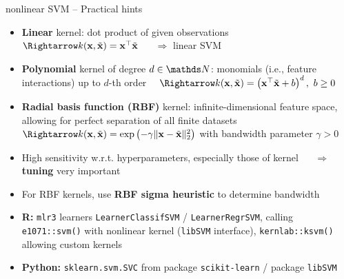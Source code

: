 \begin{frame}{nonlinear SVM -- Practical hints}

\footnotesize


\begin{itemize}
  \item \textbf{Linear} kernel: dot product of given observations ~~ 
  $\Rightarrow \kxxt = \xv^\top \xtil$ ~~ $\Rightarrow$ linear SVM
  \item \textbf{Polynomial} kernel of degree $d \in \N$: monomials (i.e., 
  feature interactions) up to $d$-th 
  order ~~$\Rightarrow 
  \kxxt = \left(\xv^\top \xtil + b \right)^d, ~ b \geq 0$
  \item \textbf{Radial basis function (RBF)} kernel: infinite-dimensional 
  feature space, allowing for perfect separation of all finite 
  datasets ~~ $\Rightarrow \kxxt = \exp \left( -\gamma \| \xv - \xtil \|_2^2 
  \right )$ with 
  bandwidth parameter $\gamma > 0$
\end{itemize}
 
\medskip

 
 \begin{itemize}
  \item High sensitivity w.r.t. hyperparameters, especially those of kernel
  ~~ $\Rightarrow$ \textbf{tuning} very important
  \item For RBF kernels, use \textbf{RBF sigma heuristic} to determine 
  bandwidth
\end{itemize}

  \medskip

\begin{itemize}
  \item \textbf{R:} \texttt{mlr3} learners \texttt{LearnerClassifSVM} /
  \texttt{LearnerRegrSVM}, calling \texttt{e1071::svm()} with nonlinear kernel (\texttt{libSVM} interface),
  \texttt{kernlab::ksvm()} allowing custom kernels
  \item \textbf{Python:} \texttt{sklearn.svm.SVC} from package 
  \texttt{scikit-learn} / package \texttt{libSVM}
\end{itemize}

\end{frame}



